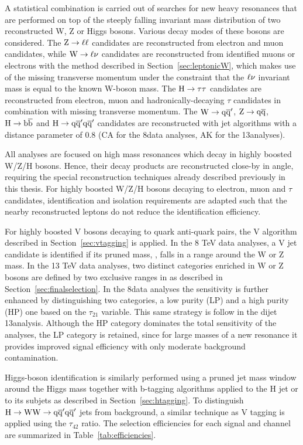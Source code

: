 A statistical combination is carried out of searches for new heavy resonances that are performed on top of the steeply falling invariant mass distribution of two reconstructed W, Z or Higgs bosons. Various decay modes of these bosons are considered.
The $\mathrm{Z}\to\ell\ell$ candidates are reconstructed from electron and muon candidates, while $\mathrm{W}\to\ell\nu$ candidates are reconstructed from identified muons or electrons with the method described in Section~\ref{sec:leptonicW}, which makes use of the missing transverse momentum under the constraint that the $\ell\nu$ invariant mass is equal to the known W-boson mass.
The $\mathrm{H}\to\tau\tau$ candidates are reconstructed from electron, muon and hadronically-decaying $\tau$ candidates in combination with missing transverse momentum.
The $\mathrm{W}\to\mathrm{q}\overline{\mathrm{q}}'$, $\mathrm{Z}\to\mathrm{q}\overline{\mathrm{q}}$, $\mathrm{H}\to{\mathrm{b}\overline{\mathrm{b}}}$ and $\mathrm{H}\to\mathrm{q}\overline{\mathrm{q}}'\mathrm{q}\overline{\mathrm{q}}'$ candidates are reconstructed with jet algorithms with a distance parameter of 0.8 (CA for the 8\TeV data analyses, AK for the 13\TeV analyses). 

All analyses are focused on high mass resonances which decay in highly boosted W/Z/H bosons. Hence, their decay products are reconstructed close-by in angle, requiring the special reconstruction techniques already described previously in this thesis. For highly boosted W/Z/H bosons decaying to electron, muon and $\tau$ candidates, identification and isolation requirements are adapted such that the nearby reconstructed leptons do not reduce the identification efficiency.

For highly boosted V bosons decaying to quark anti-quark pairs, the V algorithm described in Section~\ref{sec:vtagging} is applied.
In the 8 TeV data analyses, a V jet candidate is identified if its pruned mass, \mJ, falls in a range around the W or Z mass.
In the 13 TeV data analyses, two distinct categories enriched in W or Z bosons are defined by two exclusive ranges in \mJ as described in Section~\ref{sec:finalselection}.
In the 8\TeV data analyses the sensitivity is further enhanced by distinguishing two categories, a low purity (LP) and a high purity (HP) one based on the $\tau_{21}$ variable.
This same strategy is follow in the dijet 13\TeV analysis. Although the HP category dominates the total sensitivity of the analyses, the LP category is retained,
since for large masses of a new resonance it provides improved signal efficiency with only moderate background contamination.

Higgs-boson identification is similarly performed using a pruned jet mass window around the Higgs mass together with b-tagging algorithms applied to the H jet or to its subjets as described in Section~\ref{sec:htagging}.
To distinguish $\mathrm{H}\to\mathrm{W}\mathrm{W}\to\mathrm{q}\overline{\mathrm{q}}'\mathrm{q}\overline{\mathrm{q}}'$ jets from background, a similar technique as V tagging is applied using the $\tau_{42}$ ratio. The selection efficiencies for each signal and channel are summarized in Table~\ref{tab:efficiencies}.

